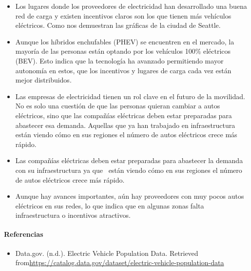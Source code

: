 \documentclass[
]{article}
\providecommand{\tightlist}{%
  \setlength{\itemsep}{0pt}\setlength{\parskip}{0pt}}
\begin{document}
\begin{itemize}
\item
  Los lugares donde los proveedores de electricidad han desarrollado una
  buena red de carga y existen incentivos claros son los que tienen más
  vehículos eléctricos. Como nos demuestran las gráficas de la ciudad de
  Seattle.
\item
  Aunque los híbridos enchufables (PHEV) se encuentren en el mercado, la
  mayoría de las personas están optando por los vehículos 100\%
  eléctricos (BEV). Esto indica que la tecnología ha avanzado
  permitiendo mayor autonomía en estos, que los incentivos y lugares de
  carga cada vez están mejor distribuidos.
\item
  Las empresas de electricidad tienen un rol clave en el futuro de la
  movilidad. No es solo una cuestión de que las personas quieran cambiar
  a autos eléctricos, sino que las compañías eléctricas deben estar
  preparadas para abastecer esa demanda. Aquellas que ya han trabajado
  en infraestructura están viendo cómo en sus regiones el número de
  autos eléctricos crece más rápido.
\item
  Las compañías eléctricas deben estar preparadas para abastecer la
  demanda con su infraestructura ya que~ están viendo cómo en sus
  regiones el número de autos eléctricos crece más rápido.
\item
  Aunque hay avances importantes, aún hay proveedores con muy pocos
  autos eléctricos en sus redes, lo que indica que en algunas zonas
  falta infraestructura o incentivos atractivos.
\end{itemize}

\paragraph{\texorpdfstring{\textbf{Referencias}}{Referencias}}\label{referencias}

\begin{itemize}
\tightlist
\item
  Data.gov. (n.d.). Electric Vehicle Population Data. Retrieved
  from\url{https://catalog.data.gov/dataset/electric-vehicle-population-data}
\end{itemize}
\end{document}
